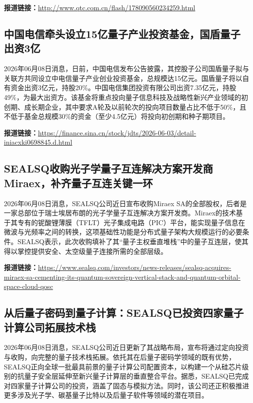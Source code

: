 \documentclass[12pt,a4paper]{ctexart}
\begin{document}
\noindent\textbf{报道链接：}\url{http://www.qtc.com.cn/flash/178090560234259.html}

\subsection{ 中国电信牵头设立15亿量子产业投资基金，国盾量子出资3亿 }

2026年06月08日消息，日前，中国电信发布公告披露，其控股子公司国盾量子拟与关联方共同设立中电信量子产业创业投资基金，总规模达15亿元。国盾量子将以自有资金出资3亿元，持股20\%。中国电信集团投资有限公司出资7.35亿元，持股49\%，为最大出资方。该基金将重点投向量子信息科技及战略性新兴产业领域的初创期、成长期企业，其中要求A轮及以前轮次的投向项目数量占比不低于50\%，且不低于基金总规模30\%的资金（至少4.5亿元）将投向初创期和种子期项目。

\noindent\textbf{报道链接：}\url{https://finance.sina.cn/stock/jdts/2026-06-03/detail-iniacxki0698845.d.html}

\subsection{ SEALSQ收购光子学量子互连解决方案开发商Miraex，补齐量子互连关键一环 }

2026年06月08日消息，SEALSQ公司近日宣布收购Miraex SA的全部股权，后者是一家总部位于瑞士埃居布朗的光子学量子互连解决方案开发商。Miraex的技术基于其专有的铌酸锂薄膜（TFLT）光子集成电路（PIC）平台，能实现量子信息在微波与光频率之间的转换，这项基础性功能是分布式量子架构大规模运行的必要条件。SEALSQ表示，此次收购填补了其“量子主权垂直堆栈”中的量子互连层，使其得以掌控提供安全、太空级量子连接所需的全部层级。

\noindent\textbf{报道链接：}\url{https://www.sealsq.com/investors/news-releases/sealsq-acquires-miraex-sa-cementing-its-quantum-sovereign-vertical-stack-and-quantum-orbital-space-cloud-qosc}

\subsection{ 从后量子密码到量子计算：SEALSQ已投资四家量子计算公司拓展技术栈 }

2026年06月08日消息，SEALSQ公司近日更新了其战略布局，宣布将通过定向投资与收购，向完整的量子技术栈拓展。依托其在后量子密码学领域的既有优势，SEALSQ正向全球一批最具前景的量子计算公司配置资本，以构建一个从硅芯片级别的抗量子安全层延伸至新兴量子计算层的垂直整合平台。据悉，SEALSQ已完成对四家量子计算公司的投资，涵盖了固态与模拟方法。同时，该公司还正积极推进更多涉及光子学、碳基量子比特以及后量子软件等领域的潜在项目。
\end{document}
